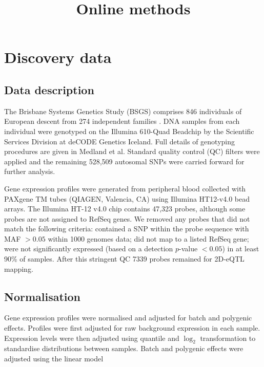 \documentclass{article}
\title{Online methods}
\date{}
\author{}
\begin{document}
\maketitle


\tableofcontents

\section{Discovery data}

\subsection{Data description}

The Brisbane Systems Genetics Study (BSGS) comprises 846 individuals of European descent from 274 independent families \cite{Powell2012}. DNA samples from each individual were genotyped on the Illumina 610-Quad Beadchip by the Scientific Services Division at deCODE Genetics Iceland. Full details of genotyping procedures are given in Medland et al. \cite{Medland2009} Standard quality control (QC) filters were applied and the remaining 528,509 autosomal SNPs were carried forward for further analysis. 

Gene expression profiles were generated from peripheral blood collected with PAXgene TM tubes (QIAGEN, Valencia, CA) using Illumina HT12-v4.0 bead arrays. The Illumina HT-12 v4.0 chip contains 47,323 probes, although some probes are not assigned to RefSeq genes. We removed any probes that did not match the following criteria: contained a SNP within the probe sequence with MAF $ > 0.05$ within 1000 genomes data; did not map to a listed RefSeq gene; were not significantly expressed (based on a detection $p$-value $< 0.05$) in at least 90\% of samples. After this stringent QC 7339 probes remained for 2D-eQTL mapping.


\subsection{Normalisation}

Gene expression profiles were normalised and adjusted for batch and polygenic effects. Profiles were first adjusted for raw background expression in each sample. Expression levels were then adjusted using quantile and $\log_2$ transformation to standardise distributions between samples. Batch and polygenic effects were adjusted using the linear model
\end{document}
